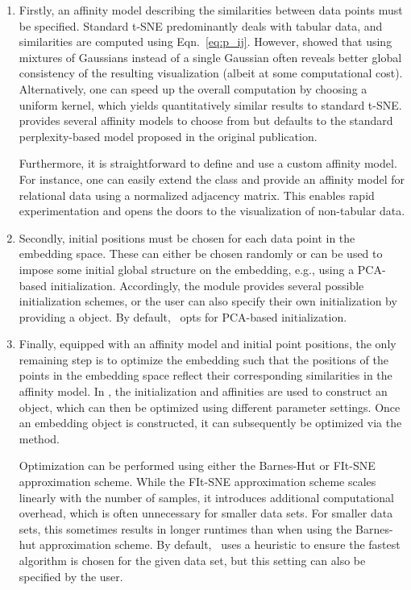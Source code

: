 \documentclass[article]{jss}
\newcommand{\opentsne}{\pkg{openTSNE}}
\begin{document}
\begin{enumerate}
\item Firstly, an affinity model describing the similarities between data points must be specified. Standard t-SNE predominantly deals with tabular data, and similarities are computed using Eqn.~\ref{eq:p_ij}. However, \citet{kobak2019art} showed that using mixtures of Gaussians instead of a single Gaussian often reveals better global consistency of the resulting visualization (albeit at some computational cost). Alternatively, one can speed up the overall computation by choosing a uniform kernel, which yields quantitatively similar results to standard t-SNE.  provides several affinity models to choose from but defaults to the standard perplexity-based model proposed in the original publication.

Furthermore, it is straightforward to define and use a custom affinity model. For instance, one can easily extend the  class and provide an affinity model for relational data using a normalized adjacency matrix. This enables rapid experimentation and opens the doors to the visualization of non-tabular data. 

\item Secondly, initial positions must be chosen for each data point in the embedding space. These can either be chosen randomly or can be used to impose some initial global structure on the embedding, e.g., using a PCA-based initialization. Accordingly, the  module provides several possible initialization schemes, or the user can also specify their own initialization by providing a  object. By default, \opentsne\ opts for PCA-based initialization.

\item Finally, equipped with an affinity model and initial point positions, the only remaining step is to optimize the embedding such that the positions of the points in the embedding space reflect their corresponding similarities in the affinity model. In \opentsne, the initialization and affinities are used to construct an  object, which can then be optimized using different parameter settings. Once an embedding object is constructed, it can subsequently be optimized via the  method.

Optimization can be performed using either the Barnes-Hut or FIt-SNE approximation scheme. While the FIt-SNE approximation scheme scales linearly with the number of samples, it introduces additional computational overhead, which is often unnecessary for smaller data sets. For smaller data sets, this sometimes results in longer runtimes than when using the Barnes-hut approximation scheme. By default, \opentsne\ uses a heuristic to ensure the fastest algorithm is chosen for the given data set, but this setting can also be specified by the user.
\end{enumerate}
\end{document}
